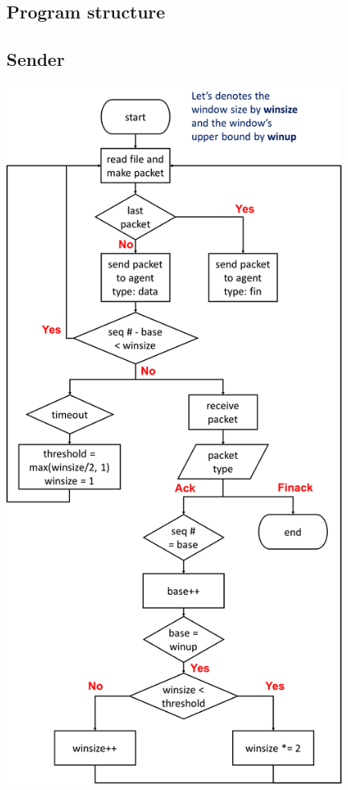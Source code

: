 \documentclass[12t, a4paper]{article}
\begin{document}
\begin{CJK}{UTF8}{bkai}
	\section*{Program structure}
		\subsection*{Sender}
			\includegraphics[height=23cm, keepaspectratio=true]{sender.png}

\end{CJK}
\end{document}
